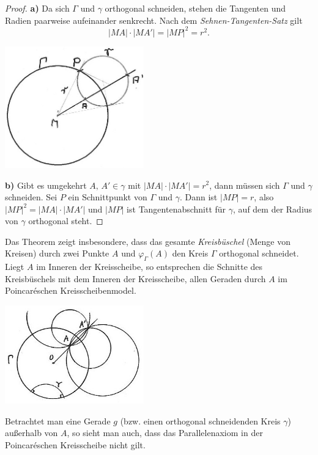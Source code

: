 \begin{proof}
{\bf a)} Da sich $\Gamma$ und $\gamma$ orthogonal schneiden,
stehen die Tangenten und Radien paarweise aufeinander senkrecht.
Nach dem {\em Sehnen-Tangenten-Satz} %
gilt
\[ |MA|\cdot |MA'|=|MP|^2=r^2.\]



\centerline{\includegraphics[width=6cm]{BILDER/4-2-02b-Inversion.jpg}}





{\bf b)} Gibt es umgekehrt $A,\,A'\in\gamma$ mit
$|MA|\cdot|MA'|=r^2$, dann m\"{u}ssen sich $\Gamma$ und
$\gamma$ schneiden. Sei $P$ ein Schnittpunkt von $\Gamma$ und
$\gamma$. Dann ist $|MP|=r$, also
$|MP|^2=|MA|\cdot|MA'|$ und $|MP|$ ist
Tangentenabschnitt f\"{u}r $\gamma$, auf dem der Radius von $\gamma$
orthogonal steht.
\end{proof}



Das Theorem zeigt insbesondere, dass das gesamte {\em Kreisbüschel} (Menge von
Kreisen) durch zwei
Punkte $A$ und $\varphi_\Gamma(A)$ den Kreis $\Gamma$ orthogonal schneidet.
Liegt $A$ im Inneren der Kreisscheibe, so entsprechen die Schnitte des
Kreisbüschels mit dem Inneren der Kreisscheibe, allen Geraden durch $A$
im Poincar\'eschen Kreisscheibenmodel. 


\centerline{\includegraphics[width=6cm]{BILDER/4-2-06-Parallel.jpg}}


Betrachtet man eine Gerade $g$ (bzw. einen orthogonal schneidenden
Kreis $\gamma$) außerhalb von $A$, so sieht man auch, dass das
Parallelenaxiom in der Poincar\'eschen Kreisscheibe nicht gilt.




